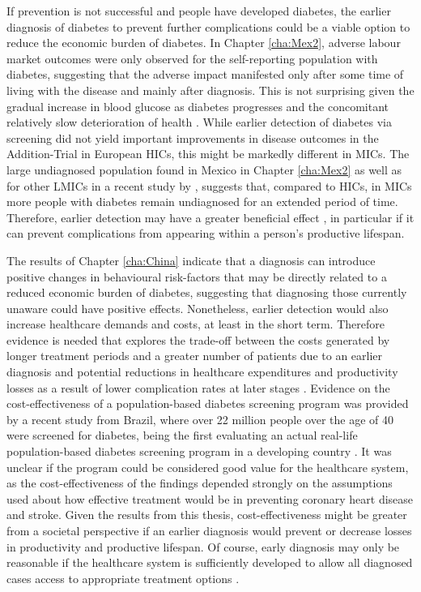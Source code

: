If prevention is not successful and people have developed diabetes, the earlier diagnosis of diabetes to prevent further complications could be a viable option to reduce the economic burden of diabetes. In Chapter \ref{cha:Mex2}, adverse labour market outcomes were only observed for the self-reporting population with diabetes, suggesting that the adverse impact manifested only after some time of living with the disease and mainly after diagnosis. This is not surprising given the gradual increase in blood glucose as diabetes progresses and the concomitant relatively slow deterioration of health \parencite{Bertram2010}. While earlier detection of diabetes via screening did not yield important improvements in disease outcomes in the Addition-Trial in European \acp{HIC}, this might be markedly different in \acp{MIC}. The large undiagnosed population found in Mexico in Chapter \ref{cha:Mex2} as well as for other \acp{LMIC} in a recent study by \textcite{Beagley2014}, suggests that, compared to \acp{HIC}, in \acp{MIC} more people with diabetes remain undiagnosed for an extended period of time. Therefore, earlier detection may have a greater beneficial effect  \parencite{Choukem2013}, in particular if it can prevent complications from appearing within a person's productive lifespan. 

The results of Chapter \ref{cha:China} indicate that a diagnosis can introduce positive changes in behavioural risk-factors that may be directly related to a reduced economic burden of diabetes, suggesting that diagnosing those currently unaware could have positive effects. Nonetheless, earlier detection would also increase healthcare demands and costs, at least in the short term. Therefore evidence is needed that explores the trade-off between the costs generated by longer treatment periods and a greater number of patients due to an earlier diagnosis and potential reductions in healthcare expenditures and productivity losses as a result of lower complication rates at later stages \parencite{Engelgau2012}. Evidence on the cost-effectiveness of a population-based diabetes screening program was provided by a recent study from Brazil, where over 22 million people over the age of 40 were screened for diabetes, being the first evaluating an actual real-life population-based diabetes screening program in a developing country \parencite{Toscano2015}. It was unclear if the program could be considered good value for the healthcare system, as the cost-effectiveness of the findings depended strongly on the assumptions used about how effective treatment would be in preventing coronary heart disease and stroke. Given the results from this thesis, cost-effectiveness might be greater from a societal perspective if an earlier diagnosis would prevent or decrease losses in productivity and productive lifespan. Of course, early diagnosis may only be reasonable if the healthcare system is sufficiently developed to allow all diagnosed cases access to appropriate treatment options \parencite{Toscano2015,Engelgau2012}. 

